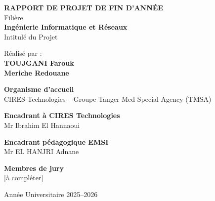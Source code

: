 \documentclass[11pt,a4paper]{report}
\begin{document}
\begin{titlepage}
{\Large\bfseries RAPPORT DE PROJET DE FIN D'ANNÉE}\\[0.4cm]

{\large Filière}\\[0.1cm]
{\bfseries Ingénierie Informatique et Réseaux}\\[0.7cm]

{\large Intitulé du Projet}\\[0.3cm]


\vspace{0.9cm}

\begin{center}
{\large Réalisé par :}\\[0.3cm]

\textbf{TOUJGANI Farouk}\\[0.15cm]
\textbf{Meriche Redouane}\\[0.15cm]
\end{center}

\vspace{0.7cm}

\begin{flushleft}
\textbf{Organisme d'accueil}\\
CIRES Technologies -- Groupe Tanger Med Special Agency (TMSA)

\vspace{0.35cm}
\textbf{Encadrant à CIRES Technologies}\\
Mr Ibrahim El Hannaoui

\vspace{0.35cm}
\textbf{Encadrant pédagogique EMSI}\\
{Mr EL HANJRI Adnane}
\end{flushleft}

\vspace{0.5cm}

\begin{center}
\textbf{Membres de jury}\\
{[à compléter]}
\end{center}

\vfill
\begin{center}
{\large Année Universitaire 2025--2026}
\end{center}

\vfill
\end{titlepage}
\end{document}
